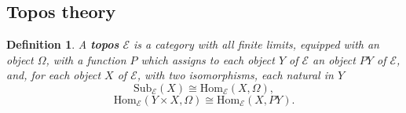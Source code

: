 \documentclass{article}
\newtheorem{definition}{Definition}[section]
\begin{document}
\subsection{Topos theory}
\begin{definition}A \textbf{topos} $\mathcal{E}$ is a category with all finite limits, equipped with an object $\Omega$, with a function $P$ which assigns to each object $Y$ of $\mathcal{E}$ an object $PY$ of $\mathcal{E}$, and, for each object $X$ of $\mathcal{E}$, with two isomorphisms, each natural in $Y$
\begin{equation}
\text{Sub}_{\mathcal{E}} (X) \cong \text{Hom}_{\mathcal{E}} (X, \Omega),
\end{equation}
\begin{equation}
\text{Hom}_{\mathcal{E}} (Y \times X, \Omega) \cong \text{Hom}_{\mathcal{E}} (X, PY).
\end{equation}


\end{definition}
\end{document}
